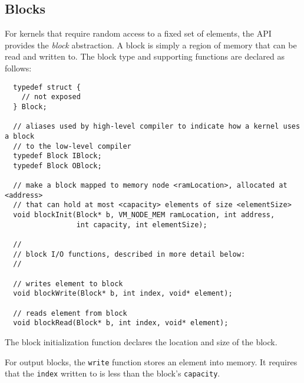 

\subsection{Blocks}
\label{sec:blocks}

For kernels that require random access to a fixed set of elements, the
API provides the {\it block} abstraction.  A block is simply a region
of memory that can be read and written to.  The block type and
supporting functions are declared as follows:

{\small
\begin{verbatim}
  typedef struct {
    // not exposed
  } Block;

  // aliases used by high-level compiler to indicate how a kernel uses a block
  // to the low-level compiler
  typedef Block IBlock;
  typedef Block OBlock;

  // make a block mapped to memory node <ramLocation>, allocated at <address> 
  // that can hold at most <capacity> elements of size <elementSize>
  void blockInit(Block* b, VM_NODE_MEM ramLocation, int address, 
                 int capacity, int elementSize);

  //
  // block I/O functions, described in more detail below:
  //

  // writes element to block
  void blockWrite(Block* b, int index, void* element);

  // reads element from block
  void blockRead(Block* b, int index, void* element); \end{verbatim}}

 The block initialization function
declares the location and size of the block.


 For output blocks, the {\tt write} function stores
an element into memory.  It requires that the {\tt index} written to
is less than the block's {\tt capacity}.

